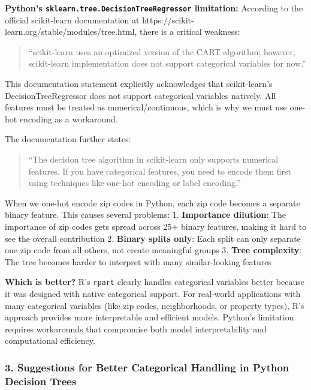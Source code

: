 \documentclass[
  letterpaper,
  DIV=11,
  numbers=noendperiod]{scrartcl}
\begin{document}
\textbf{Python's \texttt{sklearn.tree.DecisionTreeRegressor}
limitation:} According to the official scikit-learn documentation at
https://scikit-learn.org/stable/modules/tree.html, there is a critical
weakness:

\begin{quote}
``scikit-learn uses an optimized version of the CART algorithm; however,
scikit-learn implementation does not support categorical variables for
now.''
\end{quote}

This documentation statement explicitly acknowledges that scikit-learn's
DecisionTreeRegressor does not support categorical variables natively.
All features must be treated as numerical/continuous, which is why we
must use one-hot encoding as a workaround.

The documentation further states:

\begin{quote}
``The decision tree algorithm in scikit-learn only supports numerical
features. If you have categorical features, you need to encode them
first using techniques like one-hot encoding or label encoding.''
\end{quote}

When we one-hot encode zip codes in Python, each zip code becomes a
separate binary feature. This causes several problems: 1.
\textbf{Importance dilution}: The importance of zip codes gets spread
across 25+ binary features, making it hard to see the overall
contribution 2. \textbf{Binary splits only}: Each split can only
separate one zip code from all others, not create meaningful groups 3.
\textbf{Tree complexity}: The tree becomes harder to interpret with many
similar-looking features

\textbf{Which is better?} R's \texttt{rpart} clearly handles categorical
variables better because it was designed with native categorical
support. For real-world applications with many categorical variables
(like zip codes, neighborhoods, or property types), R's approach
provides more interpretable and efficient models. Python's limitation
requires workarounds that compromise both model interpretability and
computational efficiency.

\subsubsection{3. Suggestions for Better Categorical Handling in Python
Decision
Trees}\label{suggestions-for-better-categorical-handling-in-python-decision-trees}
\end{document}
